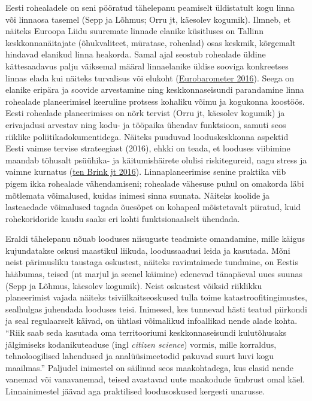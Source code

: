 \documentclass[estonian,]{article}
\begin{document}
Eesti rohealadele on seni pööratud tähelepanu peamiselt üldistatult kogu linna või linnaosa tasemel (Sepp ja Lõhmus; Orru jt, käesolev kogumik). Ilmneb, et näiteks Euroopa Liidu suuremate linnade elanike küsitluses on Tallinn keskkonnanäitajate (õhukvaliteet, müratase, rohealad) osas keskmik, kõrgemalt hindavad elanikud linna heakorda. Samal ajal seostub rohealade üldine kättesaadavus palju väiksemal määral linnaelanike üldise sooviga konkreetses linnas elada kui näiteks turvalisus või elukoht (\protect\hyperlink{Eurobarometer2016}{Eurobarometer 2016}). Seega on elanike eripära ja soovide arvestamine ning keskkonnaseisundi parandamine linna rohealade planeerimisel keeruline protsess kohaliku võimu ja kogukonna koostöös.
Eesti rohealade planeerimises on nõrk tervist (Orru jt, käesolev kogumik) ja erivajadusi arvestav ning kodu- ja tööpaika ühendav funktsioon, samuti seos riiklike poliitikadokumentidega. Näiteks puuduvad looduskeskkonna aspektid Eesti vaimse tervise strateegiast (2016), ehkki on teada, et looduses viibimine maandab tõhusalt psüühika- ja käitumishäirete olulisi riskitegureid, nagu stress ja vaimne kurnatus (\protect\hyperlink{ten2016}{ten Brink jt 2016}). Linnaplaneerimise senine praktika viib pigem ikka rohealade vähendamiseni; rohealade vähesuse puhul on omakorda läbi mõtlemata võimalused, kuidas inimesi sinna suunata. Näiteks koolide ja lasteaedade võimalused tagada õuesõpet on kohapeal mõistetavalt piiratud, kuid rohekoridoride kaudu saaks eri kohti funktsionaalselt ühendada.

Eraldi tähelepanu nõuab looduses niisuguste teadmiste omandamine, mille käigus kujundatakse oskusi maastikul liikuda, loodussaadusi leida ja kasutada. Mõni neist pärimusliku taustaga oskustest, näiteks ravimtaimede tundmine, on Eestis hääbumas, teised (nt marjul ja seenel käimine) edenevad tänapäeval uues suunas (Sepp ja Lõhmus, käesolev kogumik). Neist oskustest võiksid riiklikku planeerimist vajada näiteks tsiviilkaitseoskused tulla toime katastroofitingimustes, sealhulgas juhendada looduses teisi. Inimesed, kes tunnevad hästi teatud piirkondi ja seal regulaarselt käivad, on ühtlasi võimalikud infoallikad nende alade kohta. ``Riik saab seda kasutada oma territooriumi keskkonnaseisundi kulutõhusaks jälgimiseks kodanikuteaduse (ingl \emph{citizen science}) vormis, mille korraldus, tehnoloogilised lahendused ja analüüsimeetodid pakuvad suurt huvi kogu maailmas.'' Paljudel inimestel on säilinud seos maakohtadega, kus elasid nende vanemad või vanavanemad, teised avastavad uute maakodude ümbrust omal käel. Linnainimestel jäävad aga praktilised loodusoskused kergesti unarusse.
\end{document}

